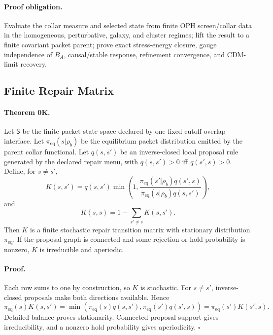 \documentclass[11pt]{article}
\begin{document}
\paragraph{Proof obligation.}
Evaluate the collar measure and selected state from finite OPH screen/collar
data in the homogeneous, perturbative, galaxy, and cluster regimes; lift the
result to a finite covariant packet parent; prove exact stress-energy closure,
gauge independence of \(B_A\), causal/stable response, refinement convergence,
and CDM-limit recovery.

\subsection{Finite Repair Matrix}

\paragraph{Theorem 0K.}
Let \(\mathsf S\) be the finite packet-state space declared by one
fixed-cutoff overlap interface.  Let \(\pi_{\mathrm{eq}}(s|\rho_b)\) be the
equilibrium packet distribution emitted by the parent collar functional.  Let
\(q(s,s')\) be an inverse-closed local proposal rule generated by the declared
repair menu, with \(q(s,s')>0\) iff \(q(s',s)>0\).  Define, for \(s\ne s'\),
\begin{equation}
  K(s,s')
  =
  q(s,s')
  \min\!\left(
    1,
    \frac{\pi_{\mathrm{eq}}(s'|\rho_b)q(s',s)}
         {\pi_{\mathrm{eq}}(s|\rho_b)q(s,s')}
  \right),
\end{equation}
and
\begin{equation}
  K(s,s)=1-\sum_{s'\ne s}K(s,s').
\end{equation}
Then \(K\) is a finite stochastic repair transition matrix with stationary
distribution \(\pi_{\mathrm{eq}}\).  If the proposal graph is connected and
some rejection or hold probability is nonzero, \(K\) is irreducible and
aperiodic.

\paragraph{Proof.}
Each row sums to one by construction, so \(K\) is stochastic.  For
\(s\ne s'\), inverse-closed proposals make both directions available.  Hence
\begin{equation}
  \pi_{\mathrm{eq}}(s)K(s,s')
  =
  \min\!\left(
    \pi_{\mathrm{eq}}(s)q(s,s'),
    \pi_{\mathrm{eq}}(s')q(s',s)
  \right)
  =
  \pi_{\mathrm{eq}}(s')K(s',s).
\end{equation}
Detailed balance proves stationarity.  Connected proposal support gives
irreducibility, and a nonzero hold probability gives aperiodicity. \(\square\)
\end{document}
